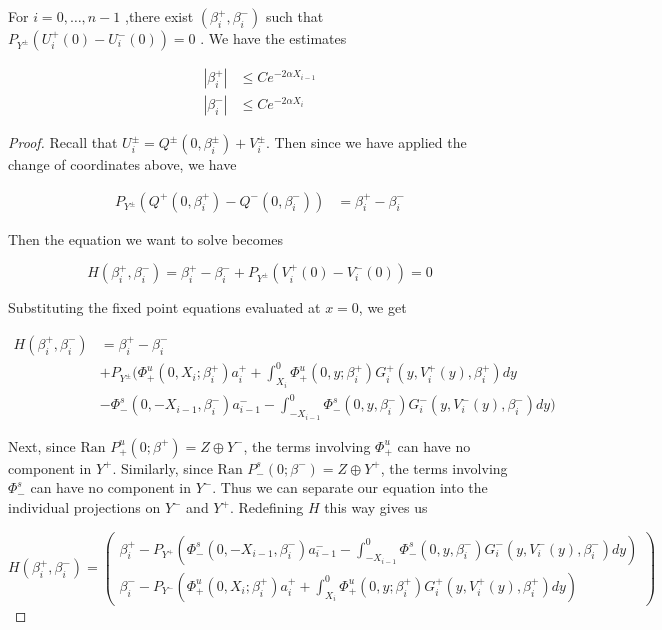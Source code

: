 \documentclass[thesis.tex]{subfiles}
\begin{document}
\begin{lemma}\label{solveforbeta}
For $i = 0, \dots, n-1$ ,there exist $(\beta_i^+, \beta_i^-)$ such that $P_{Y^\pm}(U_i^+(0) - U_i^-(0)) = 0$ . We have the estimates

\begin{align}
| \beta_i^+ | &\leq C e^{-2 \alpha X_{i-1}} \\
| \beta_i^- | &\leq C e^{-2 \alpha X_i}
\end{align}

\begin{proof}
Recall that $U_i^\pm = Q^\pm(0, \beta_i^\pm) + V_i^\pm$. Then since we have applied the change of coordinates above, we have

\begin{align*}
P_{Y^\pm}(Q^+(0, \beta_i^+) - Q^-(0, \beta_i^-)) &= \beta_i^+ - \beta_i^-
\end{align*}

Then the equation we want to solve becomes

\begin{equation}
H(\beta_i^+, \beta_i^-) = \beta_i^+ - \beta_i^- 
+ P_{Y^\pm}(V_i^+(0) - V_i^-(0)) = 0
\end{equation}

Substituting the fixed point equations evaluated at $x = 0$, we get

\begin{align*}
H(\beta_i^+, \beta_i^-) &= \beta_i^+ - \beta_i^- \\
&+ P_{Y^\pm} \Big( \Phi^u_+(0, X_i; \beta_i^+) a_i^+ 
+ \int_{X_i}^0 \Phi_+^u(0, y; \beta_i^+) G_i^+(y, V_i^+(y),\beta_i^+)dy \\
&- \Phi^s_-(0, -X_{i-1}, \beta_i^-) a_{i-1}^- 
- \int_{-X_{i-1}}^0 \Phi_-^s(0, y, \beta_i^-) G_i^-(y, V_i^-(y),\beta_i^-) dy \Big) 
\end{align*}

Next, since $\text{Ran }P_+^u(0; \beta^+) = Z \oplus Y^-$, the terms involving $\Phi^u_+$ can have no component in $Y^+$. Similarly, since $\text{Ran }P_-^s(0; \beta^-) = Z \oplus Y^+$, the terms involving $\Phi^s_-$ can have no component in $Y^-$. Thus we can separate our equation into the individual projections on $Y^-$ and $Y^+$. Redefining $H$ this way gives us

\begin{equation}
H(\beta_i^+, \beta_i^-) = 
\begin{pmatrix}
\beta_i^+ - P_{Y^+}\left(\Phi^s_-(0, -X_{i-1}, \beta_i^-) a_{i-1}^- 
- \int_{-X_{i-1}}^0 \Phi_-^s(0, y, \beta_i^-) G_i^-(y, V_i^-(y),\beta_i^-) dy\right) \\
\beta_i^- - P_{Y^-}\left( \Phi^u_+(0, X_i; \beta_i^+) a_i^+ 
+ \int_{X_i}^0 \Phi_+^u(0, y; \beta_i^+) G_i^+(y, V_i^+(y),\beta_i^+)dy \right)
\end{pmatrix}
\end{equation}


\end{proof}
\end{lemma}
\end{document}
